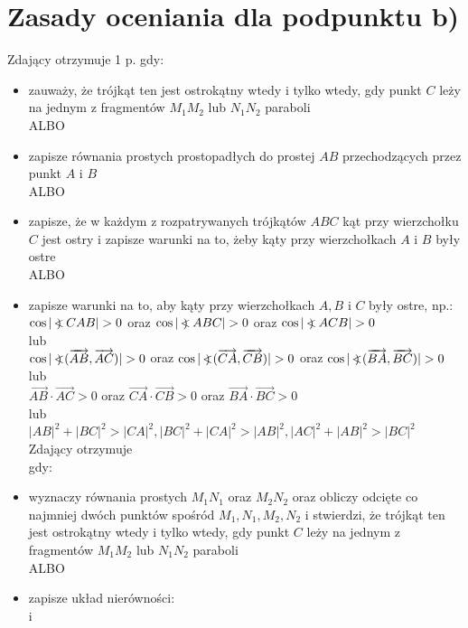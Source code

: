 \documentclass[10pt]{article}
\newcommand\Varangle{\mathop{{<\!\!\!\!\!\text{\small)}}\:}\nolimits}
\begin{document}
\section*{Zasady oceniania dla podpunktu b)}
Zdający otrzymuje 1 p. gdy:

\begin{itemize}
  \item zauważy, że trójkąt ten jest ostrokątny wtedy i tylko wtedy, gdy punkt $C$ leży na jednym z fragmentów $M_{1} M_{2}$ lub $N_{1} N_{2}$ paraboli\\
ALBO
  \item zapisze równania prostych prostopadłych do prostej $A B$ przechodzących przez punkt $A$ i $B$\\
ALBO
  \item zapisze, że w każdym z rozpatrywanych trójkątów $A B C$ kąt przy wierzchołku $C$ jest ostry i zapisze warunki na to, żeby kąty przy wierzchołkach $A$ i $B$ były ostre\\
ALBO
  \item zapisze warunki na to, aby kąty przy wierzchołkach $A, B$ i $C$ były ostre, np.: $\cos |\Varangle C A B|>0$ oraz $\cos |\Varangle A B C|>0$ oraz $\cos |\Varangle A C B|>0$\\
lub\\
$\cos |\Varangle(\overrightarrow{A B}, \overrightarrow{A C})|>0$ oraz $\cos |\Varangle(\overrightarrow{C A}, \overrightarrow{C B})|>0$ oraz $\cos |\Varangle(\overrightarrow{B A}, \overrightarrow{B C})|>0$\\
lub\\
$\overrightarrow{A B} \cdot \overrightarrow{A C}>0$ oraz $\overrightarrow{C A} \cdot \overrightarrow{C B}>0$ oraz $\overrightarrow{B A} \cdot \overrightarrow{B C}>0$\\
lub\\
$|A B|^{2}+|B C|^{2}>|C A|^{2},|B C|^{2}+|C A|^{2}>|A B|^{2},|A C|^{2}+|A B|^{2}>|B C|^{2}$\\
Zdający otrzymuje\\
gdy:
  \item wyznaczy równania prostych $M_{1} N_{1}$ oraz $M_{2} N_{2}$ oraz obliczy odcięte co najmniej dwóch punktów spośród $M_{1}, N_{1}, M_{2}, N_{2}$ i stwierdzi, że trójkąt ten jest ostrokątny wtedy i tylko wtedy, gdy punkt $C$ leży na jednym z fragmentów $M_{1} M_{2}$ lub $N_{1} N_{2}$ paraboli\\
ALBO
  \item zapisze układ nierówności:\\
i
\end{itemize}
\end{document}
